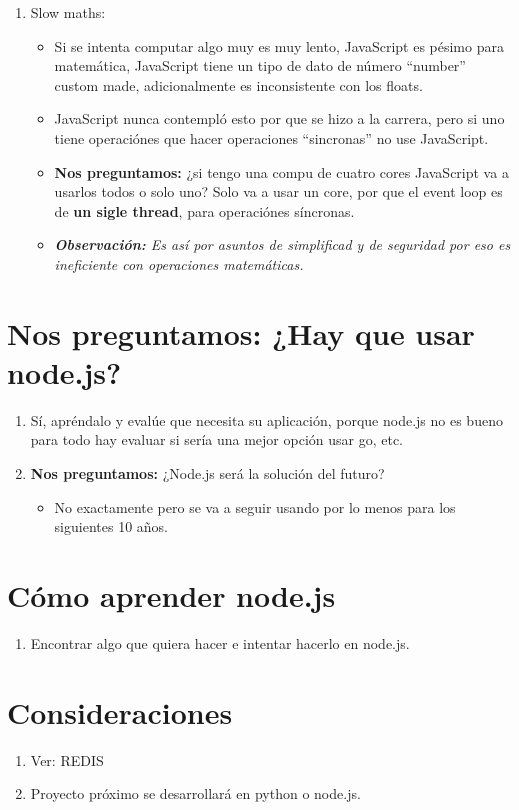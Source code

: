 \begin{enumerate}
    \item Slow maths: 
        \begin{itemize}
            \item Si se intenta computar algo muy es muy lento, JavaScript es pésimo para matemática, JavaScript tiene un tipo de dato de número ``number'' custom made, adicionalmente es inconsistente con los floats.
            \item JavaScript nunca contempló esto por que se hizo a la carrera, pero si uno tiene operaciónes que hacer operaciones ``sincronas'' no use JavaScript.
            \item \textbf{Nos preguntamos:} ¿si tengo una compu de cuatro cores JavaScript va a usarlos todos o solo uno? Solo va a usar un core, por que el event loop es de \textbf{un sigle thread}, para operaciónes síncronas.
            \item \emph{\textbf{Observación: }Es así por asuntos de simplificad y de seguridad por eso es ineficiente con operaciones matemáticas.}
        \end{itemize}
\end{enumerate}

\section{\textbf{Nos preguntamos:} ¿Hay que usar node.js?}
\begin{enumerate}
    \item Sí, apréndalo y evalúe que necesita su aplicación, porque node.js no es bueno para todo hay evaluar si sería una mejor opción usar go, etc.
    \item \textbf{Nos preguntamos:} ¿Node.js será la solución del futuro?
        \begin{itemize}
            \item No exactamente pero se va a seguir usando por lo menos para los siguientes 10 años.  
        \end{itemize}
\end{enumerate}

\section{Cómo aprender node.js}
\begin{enumerate}
    \item Encontrar algo que quiera hacer e intentar hacerlo en node.js.
\end{enumerate}

\section{Consideraciones}
\begin{enumerate}
    \item Ver: REDIS
    \item Proyecto próximo se desarrollará en python o node.js.
\end{enumerate}

